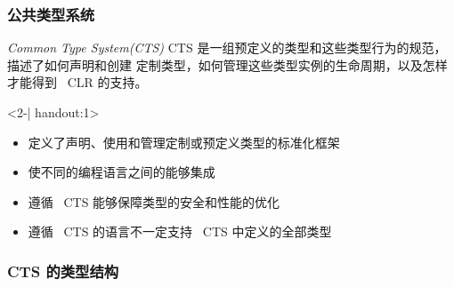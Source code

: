 \begin{frame}
\frametitle{公共类型系统}

\begin{block}{\textit{Common Type System(CTS)}}
  \CJKindent CTS 是一组预定义的类型和这些类型行为的规范，描述了如何声明和创建
  定制类型，如何管理这些类型实例的生命周期，以及怎样才能得到 ~CLR 的支持。
\end{block}

\begin{uncoverenv}<2-| handout:1>
  \begin{itemize}
  \item 定义了声明、使用和管理定制或预定义类型的标准化框架
  \item 使不同的编程语言之间的能够集成
  \item 遵循 ~CTS 能够保障类型的安全和性能的优化
  \item 遵循 ~CTS 的语言不一定支持 ~CTS 中定义的全部类型
  \end{itemize}
\end{uncoverenv}
\end{frame}

\begin{frame}[c]
\frametitle{CTS 的类型结构}

\begin{figure}[h]  
  \centering  
\end{figure}
\end{frame}


